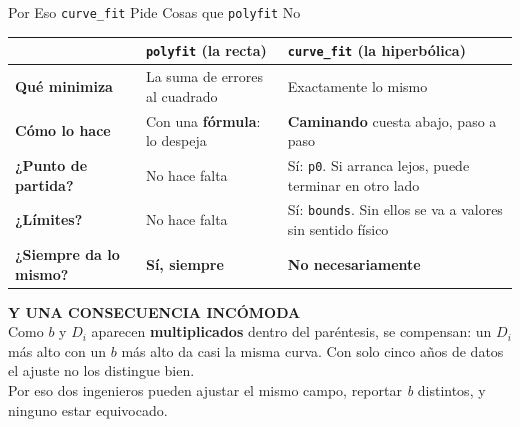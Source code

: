 \documentclass[aspectratio=169, 11pt]{beamer}
\begin{document}
\begin{frame}[shrink=40]{Por Eso \texttt{curve\_fit} Pide Cosas que \texttt{polyfit} No}
  \vspace{-4pt}
  {\footnotesize
  \renewcommand{\arraystretch}{1.35}
  \begin{tabular}{@{}p{3.0cm}p{5.4cm}p{5.9cm}@{}}
    \toprule
    &
    {\color{codeBlue}\bfseries \texttt{polyfit} (la recta)} &
    {\color{codeOrange}\bfseries \texttt{curve\_fit} (la hiperbólica)} \\
    \midrule
    {\color{arcaDark}\bfseries Qué minimiza} &
      La suma de errores al cuadrado &
      Exactamente lo mismo \\
    {\color{arcaDark}\bfseries Cómo lo hace} &
      Con una \textbf{fórmula}: lo despeja &
      \textbf{Caminando} cuesta abajo, paso a paso \\
    {\color{arcaDark}\bfseries ¿Punto de partida?} &
      No hace falta &
      Sí: \texttt{p0}. Si arranca lejos, puede terminar en otro lado \\
    {\color{arcaDark}\bfseries ¿Límites?} &
      No hace falta &
      Sí: \texttt{bounds}. Sin ellos se va a valores sin sentido físico \\
    \rowcolor{arcaGray}
    {\color{arcaDark}\bfseries ¿Siempre da lo mismo?} &
      {\color{codeGreen}\bfseries Sí, siempre} &
      {\color{arcaRed}\bfseries No necesariamente} \\
    \bottomrule
  \end{tabular}}
  \vspace{8pt}

  \begin{tcolorbox}[colback=arcaGray, colframe=arcaRed, boxrule=0pt, leftrule=3pt,
    arc=3pt, left=8pt, right=8pt, top=5pt, bottom=5pt]
    {\scriptsize\color{arcaRed}\bfseries\faExclamationTriangle\hspace{4pt}Y UNA CONSECUENCIA INCÓMODA}\\[4pt]
    {\scriptsize\color{textMuted}
     Como $b$ y $D_i$ aparecen \textbf{multiplicados} dentro del paréntesis, se
     compensan: un $D_i$ más alto con un $b$ más alto da casi la misma curva.
     Con solo cinco años de datos el ajuste no los distingue bien.\\[3pt]
     Por eso dos ingenieros pueden ajustar el mismo campo, reportar \emph{b}
     distintos, y ninguno estar equivocado.}
  \end{tcolorbox}
\end{frame}
\end{document}
